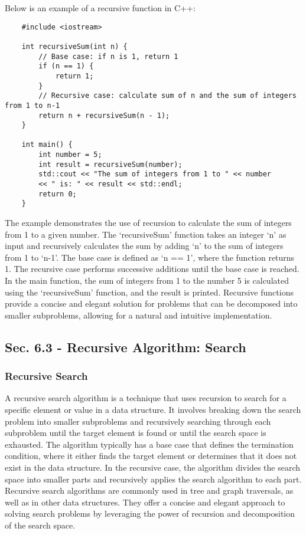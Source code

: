 \begin{solution}
    Below is an example of a recursive function in C++:

    \horizontalline

    \begin{verbatim}
    #include <iostream>

    int recursiveSum(int n) {
        // Base case: if n is 1, return 1
        if (n == 1) {
            return 1;
        }
        // Recursive case: calculate sum of n and the sum of integers from 1 to n-1
        return n + recursiveSum(n - 1);
    }
    
    int main() {
        int number = 5;
        int result = recursiveSum(number);
        std::cout << "The sum of integers from 1 to " << number 
        << " is: " << result << std::endl;
        return 0;
    }
    \end{verbatim}

    \horizontalline

    The example demonstrates the use of recursion to calculate the sum of integers from 1 to a given number. The `recursiveSum' function takes an integer `n' as input and recursively calculates the sum by adding `n' to the sum of integers from 1 to `n-1'. The base case is defined 
    as `n == 1', where the function returns 1. The recursive case performs successive additions until the base case is reached. In the main function, the sum of integers from 1 to the number 5 is calculated using the `recursiveSum' function, and the result is printed. Recursive functions 
    provide a concise and elegant solution for problems that can be decomposed into smaller subproblems, allowing for a natural and intuitive implementation.
\end{solution}

\subsection*{Sec. 6.3 - Recursive Algorithm: Search}

\subsubsection{Recursive Search}

A recursive search algorithm is a technique that uses recursion to search for a specific element or value in a data structure. It involves breaking down the search problem into smaller subproblems and recursively searching through each subproblem until the target element is found or until 
the search space is exhausted. The algorithm typically has a base case that defines the termination condition, where it either finds the target element or determines that it does not exist in the data structure. In the recursive case, the algorithm divides the search space into smaller parts 
and recursively applies the search algorithm to each part. Recursive search algorithms are commonly used in tree and graph traversals, as well as in other data structures. They offer a concise and elegant approach to solving search problems by leveraging the power of recursion and decomposition 
of the search space.

